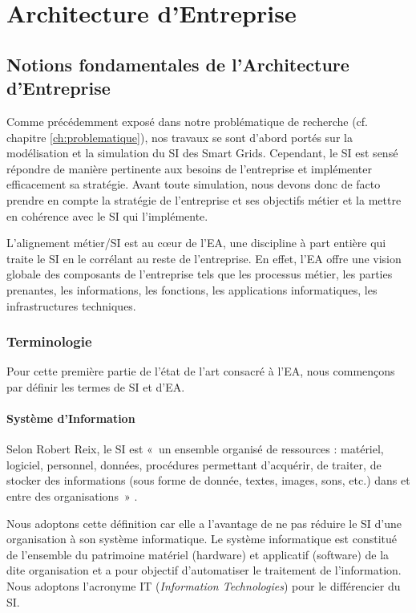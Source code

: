 \chapter{Architecture d'Entreprise}
\label{ch:EA}

\PartialToc

\section{Notions fondamentales de l'Architecture d'Entreprise}

Comme précédemment exposé dans notre problématique de recherche (cf. chapitre 
\ref{ch:problematique}), nos travaux se sont d'abord portés sur la modélisation 
et la simulation du SI des Smart Grids. Cependant, le SI est sensé répondre de 
manière pertinente aux besoins de l'entreprise et implémenter efficacement sa 
stratégie. Avant toute simulation, nous devons donc de facto prendre en compte 
la stratégie de l'entreprise et ses objectifs métier et la mettre en cohérence 
avec le SI qui l'implémente.

L'alignement métier/SI est au cœur de l'EA, une discipline à part entière qui 
traite le SI en le corrélant au reste de l'entreprise. En effet, l'EA offre une 
vision globale des composants de l'entreprise tels que les processus métier, les 
parties prenantes, les informations, les fonctions, les applications 
informatiques, les infrastructures techniques. 
 
\subsection{Terminologie}

Pour cette première partie de l'état de l'art consacré à l'EA, nous commençons 
par définir les termes de SI et d'EA. 
	
\subsubsection{Système d'Information}
\label{sec:reix}

Selon Robert Reix, le SI est «~un ensemble organisé de ressources : matériel, 
logiciel, personnel, données, procédures permettant d'acquérir, de traiter, de 
stocker des informations (sous forme de donnée, textes, images, sons, etc.) dans 
et entre des organisations~» \cite{reix1995systemes}.

Nous adoptons cette définition car elle a l'avantage de ne pas réduire le SI 
d'une organisation à son système informatique. Le système informatique est 
constitué de l'ensemble du patrimoine matériel (hardware) et applicatif 
(software) de la dite 
organisation et a pour objectif d'automatiser le traitement de l'information. 
Nous adoptons l'acronyme IT (\textit{Information Technologies}) pour le 
différencier du SI.

